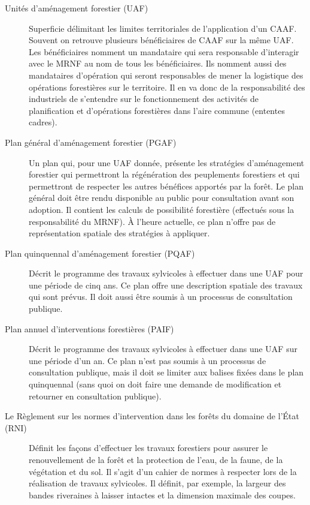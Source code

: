 \begin{description}
\item[Unités d'aménagement forestier (UAF)] Superficie délimitant les limites territoriales de l'application d'un CAAF. Souvent on retrouve plusieurs bénéficiaires de CAAF sur la même UAF. Les bénéficiaires nomment un mandataire qui sera responsable d'interagir avec le MRNF au nom de tous les bénéficiaires. Ils nomment aussi des mandataires d'opération qui seront responsables de mener la logistique des opérations forestières sur le territoire. Il en va donc de la responsabilité des industriels de s'entendre sur le fonctionnement des activités de planification et d'opérations forestières dans l'aire commune (ententes cadres).

\item[Plan général d'aménagement forestier (PGAF)] Un plan qui, pour une UAF donnée, présente les stratégies d'aménagement forestier qui permettront la régénération des peuplements forestiers et qui permettront de respecter les autres bénéfices apportés par la forêt. Le plan général doit être rendu disponible au public pour consultation avant son adoption. Il contient les calculs de possibilité forestière (effectués sous la responsabilité du MRNF). À l'heure actuelle, ce plan n'offre pas de représentation spatiale des stratégies à appliquer.

\item[Plan quinquennal d'aménagement forestier (PQAF)] Décrit le programme des travaux sylvicoles à effectuer dans une UAF pour une période de cinq ans. Ce plan offre une description spatiale des travaux qui sont prévus. Il doit aussi être soumis à un processus de consultation publique.

\item[Plan annuel d'interventions forestières (PAIF)] Décrit le programme des travaux sylvicoles à effectuer dans une UAF sur une période d'un an. Ce plan n'est pas soumis à un processus de consultation publique, mais il doit se limiter aux balises fixées dans le plan quinquennal (sans quoi on doit faire une demande de modification et retourner en consultation publique).

\item[Le Règlement sur les normes d'intervention dans les forêts du domaine de l'État (RNI)] Définit les façons d'effectuer les travaux forestiers pour assurer le renouvellement de la forêt et la protection de l'eau, de la faune, de la végétation et du sol. Il s'agit d'un cahier de normes à respecter lors de la réalisation de travaux sylvicoles. Il définit, par exemple, la largeur des bandes riveraines à laisser intactes et la dimension maximale des coupes.


\end{description}
